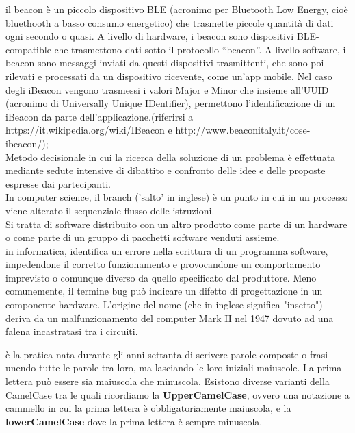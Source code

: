 \documentclass{scalatekids-article}
\begin{document}
 il beacon è un piccolo dispositivo BLE (acronimo per Bluetooth Low Energy, cioè bluethooth a basso consumo energetico) che trasmette piccole quantità di dati ogni secondo o quasi.  A livello di hardware, i beacon sono dispositivi BLE-compatible che trasmettono dati sotto il protocollo “beacon”.
A livello software, i beacon sono messaggi inviati da questi dispositivi trasmittenti, che sono poi rilevati e processati da un dispositivo ricevente, come un’app mobile. Nel caso degli iBeacon vengono trasmessi i valori Major e Minor che insieme all’UUID (acronimo di Universally Unique IDentifier), permettono l’identificazione di un iBeacon da parte dell’applicazione.(riferirsi a https://it.wikipedia.org/wiki/IBeacon e http://www.beaconitaly.it/cose-ibeacon/);
\\

 Metodo decisionale in cui la ricerca della soluzione di un problema è effettuata mediante sedute intensive di dibattito e confronto delle idee e delle proposte espresse dai partecipanti.
\\

 In computer science, il branch ('salto' in inglese) è un punto in cui in un processo viene alterato il sequenziale flusso delle istruzioni.
\\

 Si tratta di software distribuito con un altro prodotto come parte di un hardware o come parte di un gruppo di pacchetti software venduti assieme.
\\

 in informatica, identifica un errore nella scrittura di un programma software, impedendone il corretto funzionamento e provocandone un comportamento imprevisto o comunque diverso da quello specificato dal produttore. Meno comunemente, il termine bug può indicare un difetto di progettazione in un componente hardware.
L'origine del nome (che in inglese significa "insetto") deriva da un malfunzionamento del computer Mark II nel 1947 dovuto ad una falena incastratasi tra i circuiti.
\\


 è la pratica nata durante gli anni settanta di scrivere parole composte o frasi unendo tutte le parole tra loro, ma lasciando le loro iniziali maiuscole. La prima lettera può essere sia maiuscola che minuscola.
Esistono diverse varianti della CamelCase tra le quali ricordiamo la \textbf{UpperCamelCase}, ovvero una notazione a cammello in cui la prima lettera è obbligatoriamente maiuscola, e la \textbf{lowerCamelCase} dove la prima lettera è sempre minuscola.
\\
\end{document}
